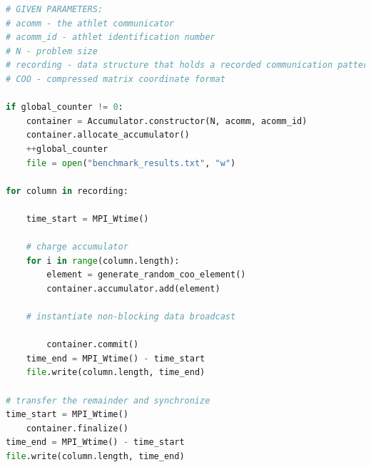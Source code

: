 \begin{minipage}{\linewidth}
\begin{lstlisting}[language=python, caption={ A pseudocode of the benchmark: modified ATHLET part}, frame=single, label={lst:beanch:pseudocode}]
# GIVEN PARAMETERS:
# acomm - the athlet communicator
# acomm_id - athlet identification number 
# N - problem size
# recording - data structure that holds a recorded communication pattern
# COO - compressed matrix coordinate format

if global_counter != 0:
	container = Accumulator.constructor(N, acomm, acomm_id)
	container.allocate_accumulator()
	++global_counter
	file = open("benchmark_results.txt", "w")

for column in recording:

	time_start = MPI_Wtime()
	
	# charge accumulator
	for i in range(column.length):
		element = generate_random_coo_element()		
		container.accumulator.add(element)

	# instantiate non-blocking data broadcast
	
		container.commit()
	time_end = MPI_Wtime() - time_start
	file.write(column.length, time_end)
	
# transfer the remainder and synchronize
time_start = MPI_Wtime()
	container.finalize()
time_end = MPI_Wtime() - time_start
file.write(column.length, time_end)


\end{lstlisting}
\end{minipage}


